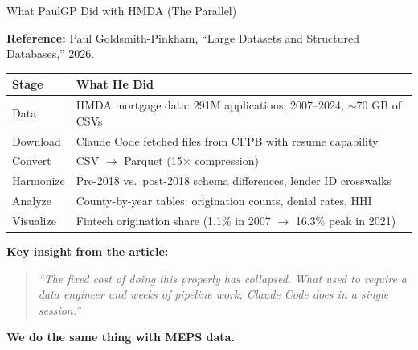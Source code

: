 \documentclass[10pt,english,aspectratio=169]{beamer}
\begin{document}
\begin{frame}{What PaulGP Did with HMDA (The Parallel)}

\textbf{Reference:} Paul Goldsmith-Pinkham, ``Large Datasets and Structured Databases,'' 2026.

\vspace{0.2cm}
\begin{small}
\begin{tabular}{lp{9cm}}
\toprule
\textbf{Stage} & \textbf{What He Did} \\
\midrule
Data & HMDA mortgage data: 291M applications, 2007--2024, $\sim$70 GB of CSVs \\
Download & Claude Code fetched files from CFPB with resume capability \\
Convert & CSV $\to$ Parquet (15$\times$ compression) \\
Harmonize & Pre-2018 vs.\ post-2018 schema differences, lender ID crosswalks \\
Analyze & County-by-year tables: origination counts, denial rates, HHI \\
Visualize & Fintech origination share (1.1\% in 2007 $\to$ 16.3\% peak in 2021) \\
\bottomrule
\end{tabular}
\end{small}

\vspace{0.3cm}
\textbf{Key insight from the article:}
\begin{quote}
{\footnotesize\itshape ``The fixed cost of doing this properly has collapsed. What used to require a data engineer and weeks of pipeline work, Claude Code does in a single session.''}
\end{quote}

\vspace{0.2cm}
\textbf{We do the same thing with MEPS data.}

\end{frame}
\end{document}
